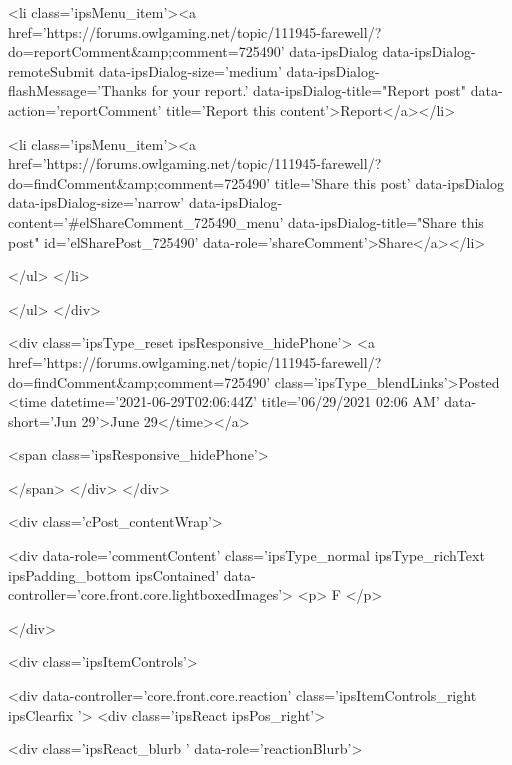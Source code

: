 							<li class='ipsMenu_item'><a href='https://forums.owlgaming.net/topic/111945-farewell/?do=reportComment&amp;comment=725490' data-ipsDialog data-ipsDialog-remoteSubmit data-ipsDialog-size='medium' data-ipsDialog-flashMessage='Thanks for your report.' data-ipsDialog-title="Report post" data-action='reportComment' title='Report this content'>Report</a></li>
						
						
							<li class='ipsMenu_item'><a href='https://forums.owlgaming.net/topic/111945-farewell/?do=findComment&amp;comment=725490' title='Share this post' data-ipsDialog data-ipsDialog-size='narrow' data-ipsDialog-content='#elShareComment_725490_menu' data-ipsDialog-title="Share this post" id='elSharePost_725490' data-role='shareComment'>Share</a></li>
						
                        
						
						
						
							
								
							
							
							
							
							
							
						
					</ul>
				</li>
				
			</ul>
		</div>

		<div class='ipsType_reset ipsResponsive_hidePhone'>
			<a href='https://forums.owlgaming.net/topic/111945-farewell/?do=findComment&amp;comment=725490' class='ipsType_blendLinks'>Posted <time datetime='2021-06-29T02:06:44Z' title='06/29/2021 02:06  AM' data-short='Jun 29'>June 29</time></a> 
			
			<span class='ipsResponsive_hidePhone'>
				
				
			</span>
		</div>
	</div>

	

    

	<div class='cPost_contentWrap'>
		
		<div data-role='commentContent' class='ipsType_normal ipsType_richText ipsPadding_bottom ipsContained' data-controller='core.front.core.lightboxedImages'>
			<p>
	F
</p>


			
		</div>

		
			<div class='ipsItemControls'>
				
					
						

	<div data-controller='core.front.core.reaction' class='ipsItemControls_right ipsClearfix '>	
		<div class='ipsReact ipsPos_right'>
			
				
				<div class='ipsReact_blurb ' data-role='reactionBlurb'>
					
